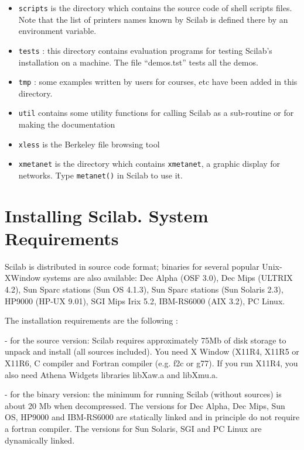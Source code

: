 \begin{itemize}
\item{{\tt scripts} is the directory which contains the source code of 
shell scripts files. Note that the list of printers  
names known by Scilab is defined there by an environment variable.}

\item{{\tt tests} : this directory contains evaluation programs for testing 
Scilab's installation on a machine. The file ``demos.tst'' tests all the 
demos.}

\item{{\tt tmp} : some examples written by users for courses, etc have been
added in this directory. }

\item{{\tt util} contains some utility functions for calling Scilab as a
sub-routine or for making the documentation }

\item{{\tt xless} is the Berkeley file browsing tool}

\item{{\tt xmetanet} is the directory which contains {\tt xmetanet}, a 
graphic display for networks. Type {\tt metanet()} in Scilab to use it.}


\end{itemize}

\section{Installing Scilab. System Requirements}
\label{install}
Scilab is distributed in source code format; binaries for several popular 
Unix-XWindow systems are also available:
Dec Alpha (OSF 3.0), Dec Mips (ULTRIX 4.2), Sun Sparc stations (Sun OS 4.1.3), 
Sun Sparc stations (Sun Solaris 2.3), HP9000 (HP-UX 9.01),
SGI Mips Irix 5.2, IBM-RS6000 (AIX 3.2), PC Linux.

The installation requirements are the following :

- for the source version: Scilab requires approximately 75Mb of 
disk storage to unpack and install (all sources included). 
You need X Window (X11R4, X11R5 or X11R6, C compiler and Fortran
compiler (e.g. f2c or g77). If you run X11R4, you also need Athena 
Widgets libraries libXaw.a and libXmu.a.
  
- for the binary version: the minimum for running Scilab (without
sources) is about 20 Mb when decompressed.
The versions for Dec Alpha, Dec Mips, Sun OS, HP9000 and 
IBM-RS6000 are statically linked and in principle
do not require a fortran compiler.
The versions for Sun Solaris, SGI and PC Linux are dynamically linked.

